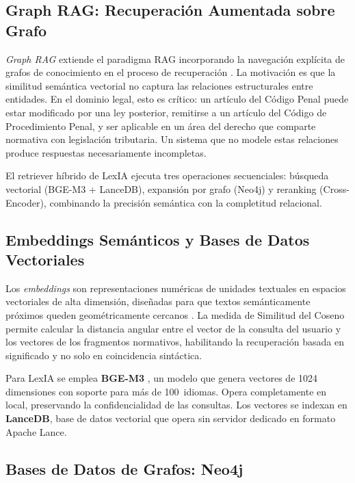 \documentclass[12pt, letterpaper]{report}
\begin{document}
\subsection{Graph RAG: Recuperaci\'{o}n Aumentada sobre Grafo}

\textit{Graph RAG} extiende el paradigma RAG incorporando la navegaci\'{o}n expl\'{i}cita de grafos de conocimiento en el proceso de recuperaci\'{o}n \cite{edge2024}. La motivaci\'{o}n es que la similitud sem\'{a}ntica vectorial no captura las relaciones estructurales entre entidades. En el dominio legal, esto es cr\'{i}tico: un art\'{i}culo del C\'{o}digo Penal puede estar modificado por una ley posterior, remitirse a un art\'{i}culo del C\'{o}digo de Procedimiento Penal, y ser aplicable en un \'{a}rea del derecho que comparte normativa con legislaci\'{o}n tributaria. Un sistema que no modele estas relaciones produce respuestas necesariamente incompletas.

El retriever h\'{i}brido de LexIA ejecuta tres operaciones secuenciales: b\'{u}squeda vectorial (BGE-M3 + LanceDB), expansi\'{o}n por grafo (Neo4j) y reranking (Cross-Encoder), combinando la precisi\'{o}n sem\'{a}ntica con la completitud relacional.

\subsection{Embeddings Sem\'{a}nticos y Bases de Datos Vectoriales}

Los \textit{embeddings} son representaciones num\'{e}ricas de unidades textuales en espacios vectoriales de alta dimensi\'{o}n, dise\~{n}adas para que textos sem\'{a}nticamente pr\'{o}ximos queden geom\'{e}tricamente cercanos \cite{reimers2019}. La medida de Similitud del Coseno permite calcular la distancia angular entre el vector de la consulta del usuario y los vectores de los fragmentos normativos, habilitando la recuperaci\'{o}n basada en significado y no solo en coincidencia sint\'{a}ctica.

Para LexIA se emplea \textbf{BGE-M3} \cite{chen2024bge}, un modelo que genera vectores de 1024 dimensiones con soporte para m\'{a}s de 100~idiomas. Opera completamente en local, preservando la confidencialidad de las consultas. Los vectores se indexan en \textbf{LanceDB}, base de datos vectorial que opera sin servidor dedicado en formato Apache Lance.

\subsection{Bases de Datos de Grafos: Neo4j}
\end{document}
